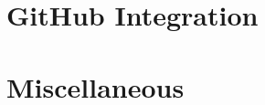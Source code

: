 \documentclass[10pt]{article}
\begin{document}


\section{GitHub Integration} %
\label{sec:github_integration}




\section{Miscellaneous} %
\label{sec:miscellaneous}






\end{document}
